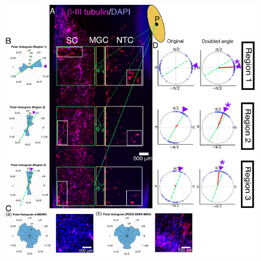 \documentclass[review]{elsarticle}
\begin{document}
\begin{figure}
	\begin{center}
		\includegraphics[width=11cm]{Fig_9.jpg}
	\end{center}

\end{figure}
\end{document}
